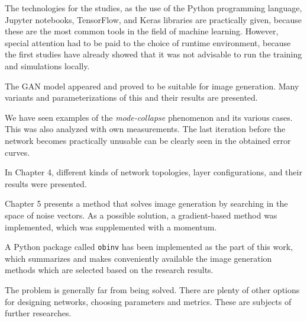 The technologies for the studies, as the use of the Python programming language, Jupyter notebooks, TensorFlow, and Keras libraries are practically given, because these are the most common tools in the field of machine learning. However, special attention had to be paid to the choice of runtime environment, because the first studies have already showed that it was not advisable to run the training and simulations locally.

The GAN model appeared and proved to be suitable for image generation. Many variants and parameterizations of this and their results are presented.

We have seen examples of the \textit{mode-collapse} phenomenon and its various cases. This was also analyzed with own measurements. The last iteration before the network becomes practically unusable can be clearly seen in the obtained error curves.

In Chapter 4, different kinds of network topologies, layer configurations, and their results were presented.

Chapter 5 presents a method that solves image generation by searching in the space of noise vectors. As a possible solution, a gradient-based method was implemented, which was supplemented with a momentum.

A Python package called \texttt{obinv} has been implemented as the part of this work, which summarizes and  makes conveniently available  the image generation methods which are selected based on the research results.

The problem is generally far from being solved. There are plenty of other options for designing networks, choosing parameters and metrics. These are subjects of further researches.
